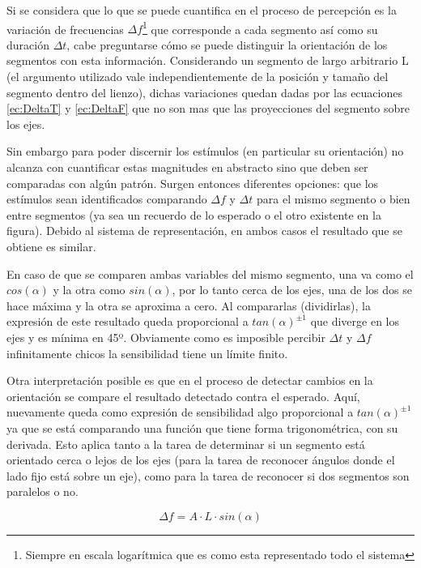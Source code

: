 \documentclass{article}
\numberwithin{figure}{section}
\begin{document}
    Si se considera que lo que se puede cuantifica en el proceso de percepción es la variación de frecuencias $\Delta f$\footnote{Siempre en escala logarítmica que es como esta representado todo el sistema} que corresponde a cada segmento así como su duración $\Delta t$, cabe preguntarse cómo se puede distinguir la orientación de los segmentos con esta información. Considerando un segmento de largo arbitrario L (el argumento utilizado vale independientemente de la posición y tamaño del segmento dentro del lienzo), dichas variaciones quedan dadas por las ecuaciones \ref{ec:DeltaT} y \ref{ec:DeltaF} que no son mas que las proyecciones del segmento sobre los ejes.
    
    Sin embargo para poder discernir los estímulos (en particular su orientación) no alcanza con cuantificar estas magnitudes en abstracto sino que deben ser comparadas con algún patrón. Surgen entonces diferentes opciones: que los estímulos sean identificados comparando $\Delta f$ y $\Delta t$ para el mismo segmento o bien entre segmentos (ya sea un recuerdo de lo esperado o el otro existente en la figura). Debido al sistema de representación, en ambos casos el resultado que se obtiene es similar. 
    
    En caso de que se comparen ambas variables del mismo segmento, una va como el $cos(\alpha)$ y la otra como $sin(\alpha)$, por lo tanto cerca de los ejes, una de los dos se hace máxima y la otra se aproxima a cero. Al compararlas (dividirlas), la expresión de este resultado queda proporcional a $tan (\alpha)^{\pm1}$ que diverge en los ejes y es mínima en 45º. Obviamente como es imposible percibir $\Delta t$ y $\Delta f$ infinitamente chicos la sensibilidad tiene un límite finito. 
    
    Otra interpretación posible es que en el proceso de detectar cambios en la orientación se compare el resultado detectado contra el esperado. Aquí, nuevamente queda como expresión de sensibilidad algo proporcional a $tan (\alpha)^{\pm1}$ ya que se está comparando una función que tiene forma trigonométrica, con su derivada. Esto aplica tanto a la tarea de determinar si un segmento está orientado cerca o lejos de los ejes (para la tarea de reconocer ángulos donde el lado fijo está sobre un eje), como para la tarea de reconocer si dos segmentos son paralelos o no. 
    
    
    \begin{equation} \label{ec:DeltaF}
        \Delta f = A \cdot L \cdot sin (\alpha)
    \end{equation}
        
\end{document}
